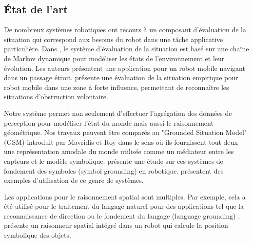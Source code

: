 \documentclass[a4paper,11pt,twoside]{StyleThese}
\begin{document}
\subsection{État de l'art}

De nombreux systèmes robotiques ont recours à un composant d'évaluation de la situation qui correspond aux besoins du robot dans une tâche applicative particulière. Dans \cite{beck2011}, le système d'évaluation de la situation est basé sur une chaîne de Markov dynamique pour modéliser les états de l'environnement et leur évolution. Les auteurs présentent une application pour un robot mobile navigant dans un passage étroit.
\cite{Kluge01situationassessment} présente une évaluation de la situation empirique pour robot mobile dans une zone à forte influence, permettant de reconnaître les situations d'obstruction volontaire.

Notre système permet non seulement d'effectuer l'agrégation des données de perception pour modéliser l'état du monde mais aussi le raisonnement géométrique. 
Nos travaux peuvent être comparés au "Grounded Situation Model" (GSM) introduit par Mavridis et Roy \cite{Mavridis2005} dans le sens où ils fournissent tout deux une représentation amodale du monde utilisée comme un médiateur entre les capteurs et le modèle symbolique. \cite{Coradeschi2013} présente une étude sur ces systèmes de fondement des symboles (symbol grounding) en robotique. \cite{Daoutis2009} \cite{Lemaignan2011}
présentent des exemples d'utilisation de ce genre de systèmes.

Les applications pour le raisonnement spatial \cite{OKeefe1999} sont multiples. Par exemple, cela a été utilisé pour le traitement du langage naturel pour des applications tel que la reconnaissance de direction \cite{Kollar10,Matuszek10}
ou le fondement du langage (language grounding) \cite{Tellex10}. \cite{Skubic2004} présente un raisonneur spatial intégré dans un robot qui calcule la position symbolique des objets.


\end{document}
